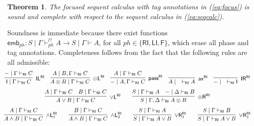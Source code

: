 \documentclass[submission,copyright,creativecommons]{eptcs}
\newtheorem{theorem}{Theorem}[section]
\theoremstyle{definition}
\newcommand{\tl}{\otimes \mathsf{L}}
\newcommand{\tr}{\otimes \mathsf{R}}
\newcommand{\pass}{\mathsf{pass}}
\newcommand{\unitl}{\mathsf{IL}}
\newcommand{\unitr}{\mathsf{IR}}
\newcommand{\andlone}{\land \mathsf{L}_{1}}
\newcommand{\andltwo}{\land \mathsf{L}_{2}}
\newcommand{\andli}{\land \mathsf{L}_{i}}
\newcommand{\orl}{\lor \mathsf{L}}
\newcommand{\orrone}{\lor \mathsf{R}_{1}}
\newcommand{\ax}{\mathsf{ax}}
\newcommand{\ot}{\otimes}
\newcommand{\I}{\mathsf{I}}
\newcommand{\RI}{\mathsf{RI}}
\newcommand{\LI}{\mathsf{LI}}
\newcommand{\F}{\mathsf{F}}
\newcommand{\tCone}{\mathbb{C}_1}
\newcommand{\tCtwo}{\mathbb{C}_2}
\begin{document}

\begin{theorem}\label{theorem:focus:sound:complete}
  The focused sequent calculus with tag annotations in (\ref{eq:focus}) is sound and complete with respect to the sequent calculus in (\ref{eq:seqcalc}).
\end{theorem}
Soundness is immediate because there exist functions $\mathsf{emb}_{ph} : S \mid \Gamma \vdash^{l?}_{ph} A \to S \mid \Gamma \vdash A$, for all $ph \in \{ \RI , \LI , \F \}$, which erase all phase and tag annotations.
Completeness follows from the fact that the following rules are all admissible:
\begin{equation}\label{eq:admis}
  \small
  \hspace*{-4mm}
    \begin{array}{c}
      \infer[\unitl^{\RI}]{\I \mid \Gamma \vdash_{\RI} C}{{-} \mid \Gamma \vdash_{\RI} C}
      \quad
      \infer[\tl^{\RI}]{A \ot B \mid \Gamma \vdash_{\RI} C}{A \mid B, \Gamma \vdash_{\RI} C}
      \quad
      \infer[\pass^{\RI}]{{-} \mid A , \Gamma \vdash_{\RI} C}{A \mid \Gamma \vdash_{\RI} C}
      \quad
      \infer[\ax^{\RI}]{A \mid \quad \vdash_{\RI} A}{}
      \quad
      \infer[\unitr^{\RI}]{{-} \mid \quad \vdash_{\RI} \I}{}
  \\[6pt]
      \infer[\orl^{\RI}]{A \lor B \mid \Gamma \vdash_{\RI} C}{
      A \mid \Gamma \vdash_{\RI} C
      &
      B \mid \Gamma \vdash_{\RI} C
      }
      \qquad
      \infer[\tr^{\RI}]{S \mid \Gamma , \Delta \vdash_{\RI} A \ot B}{
        S \mid \Gamma \vdash_{\RI} A
        &
        {-} \mid \Delta \vdash_{\RI} B
      }
  \\[6pt]
      \infer[\andlone^{\RI}]{A \land B \mid \Gamma \vdash_{\RI} C}{A \mid \Gamma \vdash_{\RI} C}
      \qquad
      \infer[\andltwo^{\RI}]{A \land B \mid \Gamma \vdash_{\RI} C}{B \mid \Gamma \vdash_{\RI} C}
      \qquad
      \infer[\orrone^{\RI}]{S \mid \Gamma \vdash_{\RI} A \lor B}{S \mid \Gamma \vdash_{\RI} A}
      \qquad
      \infer[\orrone^{\RI}]{S \mid \Gamma \vdash_{\RI} A \lor B}{S \mid \Gamma \vdash_{\RI} B}
    \end{array}
  \end{equation}
\end{document}
